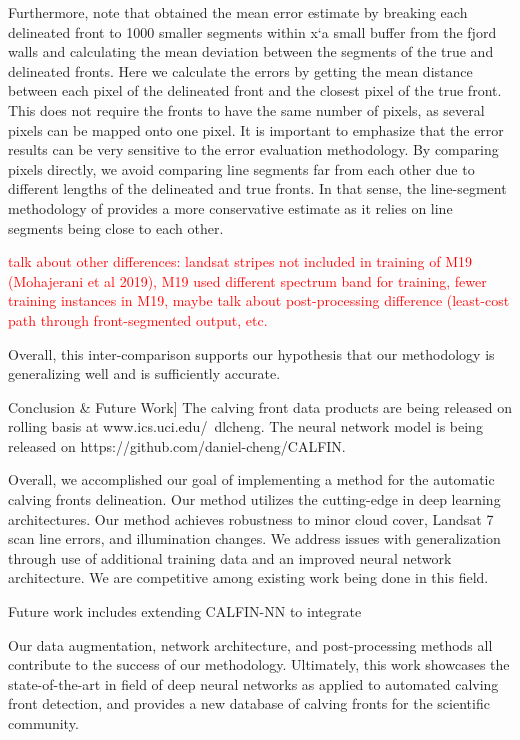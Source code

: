\documentclass[tc, manuscript]{copernicus}
\begin{document}
Furthermore, note that \citep{mohajerani2019} obtained the mean error estimate by breaking each delineated front to 1000 smaller segments within x`a small buffer from the fjord walls and calculating the mean deviation between the segments of the true and delineated fronts. Here we calculate the errors by getting the mean distance between each pixel of the delineated front and the closest pixel of the true front. This does not require the fronts to have the same number of pixels, as several pixels can be mapped onto one pixel. It is important to emphasize that the error results can be very sensitive to the error evaluation methodology. By comparing pixels directly, we avoid comparing line segments far from each other due to different lengths of the delineated and true fronts. In that sense, the line-segment methodology of \citep{mohajerani2019} provides a more conservative estimate as it relies on line segments being close to each other.

\textcolor{red}{talk about other differences: landsat stripes not included in training of M19 (Mohajerani et al 2019), M19 used different spectrum band for training, fewer training instances in M19, maybe talk about post-processing difference (least-cost path through front-segmented output, etc.}

Overall, this inter-comparison supports our hypothesis that our methodology is generalizing well and is sufficiently accurate.

\conclusions[]Conclusion \& Future Work]
The calving front data products are being released on rolling basis at www.ics.uci.edu/~dlcheng. %
The neural network model is being released on https://github.com/daniel-cheng/CALFIN.

Overall, we accomplished our goal of implementing a method for the automatic calving fronts delineation. Our method utilizes the cutting-edge in deep learning architectures. Our method achieves robustness to minor cloud cover, Landsat 7 scan line errors, and illumination changes. We address issues with generalization through use of additional training data and an improved neural network architecture. We are competitive among existing work being done in this field.  

Future work includes extending CALFIN-NN to integrate 

Our data augmentation, network architecture, and post-processing methods all contribute to the success of our methodology. Ultimately, this work showcases the state-of-the-art in field of deep neural networks as applied to automated calving front detection, and provides a new database of calving fronts for the scientific community.
\end{document}
